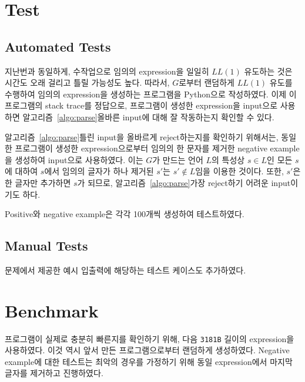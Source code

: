 \documentclass[a4paper,10pt]{scrartcl}
\numberwithin{equation}{section}
\numberwithin{figure}{section}
\numberwithin{table}{section}
\theoremstyle{definition}
\begin{document}
\section{Test}

\subsection{Automated Tests}

지난번과 동일하게, 수작업으로 임의의 expression을 일일히 $LL(1)$ 유도하는 것은 시간도 오래 걸리고 틀릴 가능성도 높다. 따라서, $G$로부터 랜덤하게 $LL(1)$ 유도를 수행하여 임의의 expression을 생성하는 프로그램을 Python으로 작성하였다. 이제 이 프로그램의 stack trace를 정답으로, 프로그램이 생성한 expression을 input으로 사용하면 알고리즘~\ref{algo:parse}\가 올바른 input에 대해 잘 작동하는지 확인할 수 있다.

알고리즘~\ref{algo:parse}\가 틀린 input을 올바르게 reject하는지를 확인하기 위해서는, 동일한 프로그램이 생성한 expression으로부터 임의의 한 문자를 제거한 negative example을 생성하여 input으로 사용하였다. 이는 $G$가 만드는 언어 $L$의 특성상 $s \in L$인 모든 $s$에 대하여 $s$에서 임의의 글자가 하나 제거된 $s'$는 $s' \notin L$임을 이용한 것이다. 또한, $s'$은 한 글자만 추가하면 $s$가 되므로, 알고리즘~\ref{algo:parse}\가 가장 reject하기 어려운 input이기도 하다.

Positive와 negative example은 각각 100개씩 생성하여 테스트하였다.

\subsection{Manual Tests}

문제에서 제공한 예시 입출력에 해당하는 테스트 케이스도 추가하였다.

\section{Benchmark}

프로그램이 실제로 충분히 빠른지를 확인하기 위해, 다음 \lstinline{3181B} 길이의 expression을 사용하였다. 이것 역시 앞서 만든 프로그램으로부터 랜덤하게 생성하였다. Negative example에 대한 테스트는 최악의 경우를 가정하기 위해 동일 expression에서 마지막 글자를 제거하고 진행하였다.
\end{document}
